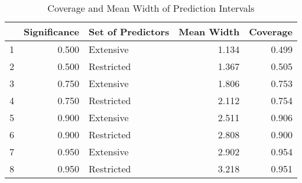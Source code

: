 \begin{table}[ht]
\centering
\begin{tabular}{rrlrr}
  \hline
 & Significance & Set of Predictors & Mean Width & Coverage \\ 
  \hline
1 & 0.500 & Extensive & 1.134 & 0.499 \\ 
  2 & 0.500 & Restricted & 1.367 & 0.505 \\ 
  3 & 0.750 & Extensive & 1.806 & 0.753 \\ 
  4 & 0.750 & Restricted & 2.112 & 0.754 \\ 
  5 & 0.900 & Extensive & 2.511 & 0.906 \\ 
  6 & 0.900 & Restricted & 2.808 & 0.900 \\ 
  7 & 0.950 & Extensive & 2.902 & 0.954 \\ 
  8 & 0.950 & Restricted & 3.218 & 0.951 \\ 
   \hline
\end{tabular}
\caption{Coverage and Mean Width of Prediction Intervals} 
\end{table}

